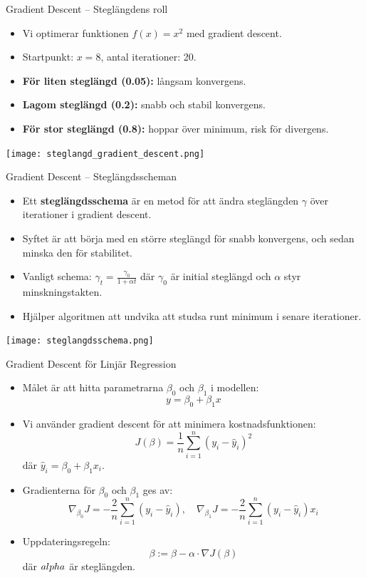 \documentclass[10pt,english]{beamer}
\begin{document}
\begin{frame}{Gradient Descent – Steglängdens roll}
  \begin{itemize}
    \item Vi optimerar funktionen $f(x) = x^2$ med gradient descent.
    \item Startpunkt: $x = 8$, antal iterationer: 20.
    \item \textbf{För liten steglängd (0.05):} långsam konvergens.
    \item \textbf{Lagom steglängd (0.2):} snabb och stabil konvergens.
    \item \textbf{För stor steglängd (0.8):} hoppar över minimum, risk för divergens.
  \end{itemize}
  \begin{center}
    \texttt{[image: steglangd\_gradient\_descent.png]}
  \end{center}
\end{frame}

\begin{frame}{Gradient Descent – Steglängdsscheman}
  \begin{itemize}
    \item Ett \textbf{steglängdsschema} är en metod för att ändra steglängden $\gamma$ över iterationer i gradient descent.
    \item Syftet är att börja med en större steglängd för snabb konvergens, och sedan minska den för stabilitet.
    \item Vanligt schema: $\gamma_t = \frac{\gamma_0}{1 + \alpha t}$ där $\gamma_0$ är initial steglängd och $\alpha$ styr minskningstakten.
    \item Hjälper algoritmen att undvika att studsa runt minimum i senare iterationer.
  \end{itemize}
  \begin{center}
    \texttt{[image: steglangdsschema.png]}
  \end{center}
\end{frame}

\begin{frame}{Gradient Descent för Linjär Regression}
  \begin{itemize}
    \item Målet är att hitta parametrarna $\beta_0$ och $\beta_1$ i modellen:
    \[
      y = \beta_0 + \beta_1 x
    \]
    \item Vi använder gradient descent för att minimera kostnadsfunktionen:
    \[
      J(\beta) = \frac{1}{n} \sum_{i=1}^n (y_i - \hat{y}_i)^2
    \]
    där $\hat{y}_i = \beta_0 + \beta_1 x_i$.
    \item Gradienterna för $\beta_0$ och $\beta_1$ ges av:
    \[
      \nabla_{\beta_0} J = -\frac{2}{n} \sum_{i=1}^n (y_i - \hat{y}_i), \quad
      \nabla_{\beta_1} J = -\frac{2}{n} \sum_{i=1}^n (y_i - \hat{y}_i)x_i
    \]
    \item Uppdateringsregeln:
    \[
      \beta := \beta - \alpha \cdot \nabla J(\beta)
    \]
    där $\\alpha$ är steglängden.
  \end{itemize}
\end{frame}
\end{document}
